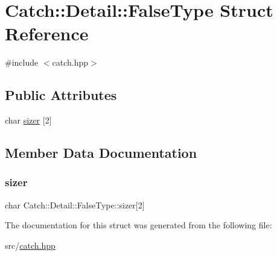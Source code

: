\hypertarget{struct_catch_1_1_detail_1_1_false_type}{}\section{Catch\+:\+:Detail\+:\+:False\+Type Struct Reference}
\label{struct_catch_1_1_detail_1_1_false_type}


{\ttfamily \#include $<$catch.\+hpp$>$}

\subsection*{Public Attributes}
\begin{DoxyCompactItemize}
\item 
char \hyperlink{struct_catch_1_1_detail_1_1_false_type_abc1a730e197d6f7750ae8aaf47b63477}{sizer} \mbox{[}2\mbox{]}
\end{DoxyCompactItemize}


\subsection{Member Data Documentation}
\mbox{\label{struct_catch_1_1_detail_1_1_false_type_abc1a730e197d6f7750ae8aaf47b63477}} 
\subsubsection{\texorpdfstring{sizer}{sizer}}
{\footnotesize\ttfamily char Catch\+::\+Detail\+::\+False\+Type\+::sizer\mbox{[}2\mbox{]}}



The documentation for this struct was generated from the following file\+:\begin{DoxyCompactItemize}
\item 
src/\hyperlink{catch_8hpp}{catch.\+hpp}\end{DoxyCompactItemize}
